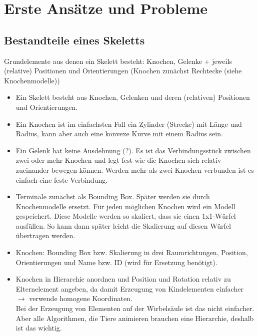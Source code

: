 \chapter{Erste Ansätze und Probleme}

\section{Bestandteile eines Skeletts}

Grundelemente aus denen ein Skelett besteht: Knochen, Gelenke + jeweils (relative) Positionen und Orientierungen (Knochen zunächst Rechtecke (siehe Knochenmodelle))

\begin{itemize}
 \item Ein Skelett besteht aus Knochen, Gelenken und deren (relativen) Positionen und Orientierungen.
 
 \item Ein Knochen ist im einfachsten Fall ein Zylinder (Strecke) mit Länge und Radius, kann aber auch eine konvexe Kurve mit einem Radius sein.
 
 \item Ein Gelenk hat keine Ausdehnung (?). Es ist das Verbindungsstück zwischen zwei oder mehr Knochen und legt fest wie die Knochen sich relativ zueinander bewegen können. Werden mehr als zwei Knochen verbunden ist es einfach eine feste Verbindung.
 
 \item Terminale zunächst als Bounding Box. Später werden sie durch Knochenmodelle ersetzt. Für jeden möglichen Knochen wird ein Modell gespeichert. Diese Modelle werden so skaliert, dass sie einen 1x1-Würfel ausfüllen. So kann dann später leicht die Skalierung auf diesen Würfel übertragen werden.
 
 \item Knochen: Bounding Box bzw. Skalierung in drei Raumrichtungen, Position, Orientierungen und Name bzw. ID (wird für Ersetzung benötigt).
 
 \item Knochen in Hierarchie anordnen und Position und Rotation relativ zu Elternelement angeben, da damit Erzeugung von Kindelementen einfacher $\rightarrow$ verwende homogene Koordinaten.\\
 Bei der Erzeugung von Elementen auf der Wirbelsäule ist das nicht einfacher. Aber alle Algorithmen, die Tiere animieren brauchen eine Hierarchie, deshalb ist das wichtig. 
 

\end{itemize}
